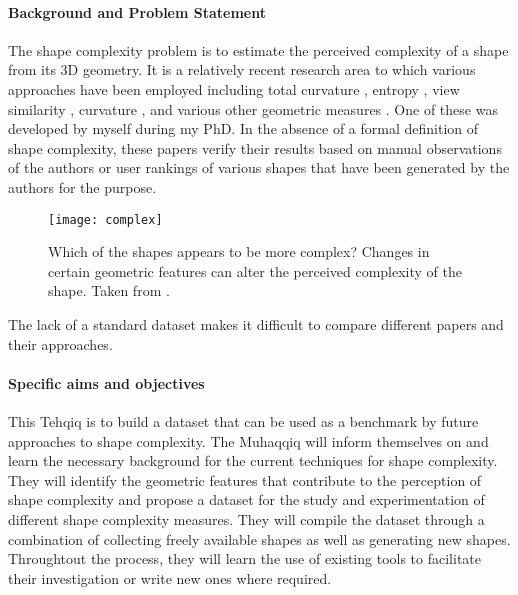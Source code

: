 \documentclass{article}
\begin{document}
\paragraph{Background and Problem Statement} The shape complexity problem is to estimate the perceived complexity of a shape from its 3D geometry. It is a relatively recent research area to which various approaches have been employed including total curvature \cite{matsumotoK_cag2018}, entropy \cite{rigauFS_smi2005}, view similarity \cite{saleemBWS_cag2011}, curvature \cite{pageKSAA_icip2003, sukumarPGKA_3dpvt2006, sukumarPKA_cvpr2008}, and various other geometric measures \cite{rossignac_vc2005}. One of these was developed by myself during my PhD. In the absence of a formal definition of shape complexity, these papers verify their results based on manual observations of the authors or user rankings of various shapes that have been generated by the authors for the purpose.

\begin{figure}
  \centering
  \texttt{[image: complex]}
  \caption{Which of the shapes appears to be more complex? Changes in certain geometric features can alter the perceived complexity of the shape. Taken from \cite{rossignac_vc2005}.}
  \label{fig:complex}
\end{figure}

The lack of a standard dataset makes it difficult to compare different papers and their approaches.

\paragraph{Specific aims and objectives} This Tehqiq is to build a dataset that can be used as a benchmark by future approaches to shape complexity. The Muhaqqiq will inform themselves on and learn the necessary background for the current techniques for shape complexity. They will identify the geometric features that contribute to the perception of shape complexity and propose a dataset for the study and experimentation of different shape complexity measures. They will compile the dataset through a combination of collecting freely available shapes as well as generating new shapes. Throughtout the process, they will learn the use of existing tools to facilitate their investigation or write new ones where required.
\end{document}

